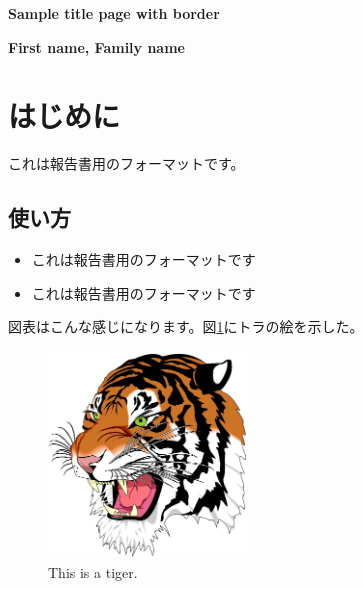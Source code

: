 \documentclass[dvipdfmx, fontsize=12pt]{jlreq}
\newcommand{\登録番号}{TR23-1001094-01}
\begin{document}
\begin{center}
        \vspace*{1cm}

        \huge
        \textbf{Sample title page with border}

        \vspace{2.0cm}
        \LARGE
        \textbf{First name, Family name}

        \vfill
\end{center}
\newpage

\lipsum[1-5]

\newpage

\section{はじめに}
これは報告書用のフォーマットです。

\subsection{使い方}
\begin{itemize}
    \item これは報告書用のフォーマットです
    \item これは報告書用のフォーマットです
\end{itemize}

図表はこんな感じになります。図\ref{tiger}にトラの絵を示した。


\begin{figure}
    \centering
    \includegraphics[keepaspectratio=true,width=0.47\textwidth]{tiger.png}
    \caption{This is a tiger.}
    \label{tiger}
\end{figure}
\end{document}

